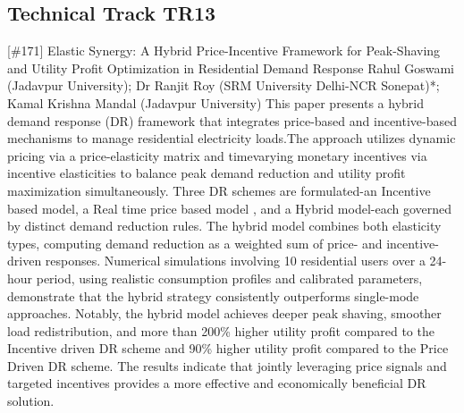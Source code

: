 \clearpage \subsection{Technical Track TR13}\nopagebreak {} \begin{abstract_online} {[\#171] Elastic Synergy: A Hybrid Price-Incentive Framework for Peak-Shaving and Utility Profit Optimization in Residential Demand Response} {} {Rahul Goswami (Jadavpur University); Dr Ranjit Roy (SRM University Delhi-NCR Sonepat)*; Kamal Krishna Mandal (Jadavpur University)} {} This paper presents a hybrid demand response (DR) framework that integrates price-based and incentive-based mechanisms to manage residential electricity loads.The approach utilizes dynamic pricing via a price-elasticity matrix and timevarying monetary incentives via incentive elasticities to balance peak demand reduction and utility profit maximization simultaneously. Three DR schemes are formulated-an Incentive based model, a Real time price based model , and a Hybrid model-each governed by distinct demand reduction rules. The hybrid model combines both elasticity types, computing demand reduction as a weighted sum of price- and incentive-driven responses. Numerical simulations involving 10 residential users over a 24-hour period, using realistic consumption profiles and calibrated parameters, demonstrate that the hybrid strategy consistently outperforms single-mode approaches. Notably, the hybrid model achieves deeper peak shaving, smoother load redistribution, and more than 200\% higher utility profit compared to the Incentive driven DR scheme and 90\% higher utility profit compared to the Price Driven DR scheme. The results indicate that jointly leveraging price signals and targeted incentives provides a more effective and economically beneficial DR solution. \end{abstract_online} 
